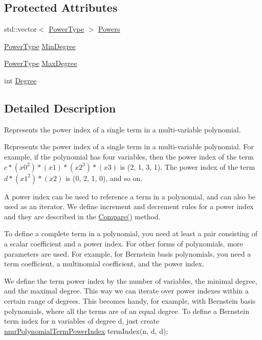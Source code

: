 \subsection*{Protected Attributes}
\begin{DoxyCompactItemize}
\item 
std\+::vector$<$ \hyperlink{classnmr_polynomial_term_power_index_a2eec01c3a2c3f56f47982ceffd8e36ed}{Power\+Type} $>$ \hyperlink{classnmr_polynomial_term_power_index_a05f4d771e733168086d285e1cf0e1d1e}{Powers}
\item 
\hyperlink{classnmr_polynomial_term_power_index_a2eec01c3a2c3f56f47982ceffd8e36ed}{Power\+Type} \hyperlink{classnmr_polynomial_term_power_index_a16ac64643c0802d0efb4bf3f617d0964}{Min\+Degree}
\item 
\hyperlink{classnmr_polynomial_term_power_index_a2eec01c3a2c3f56f47982ceffd8e36ed}{Power\+Type} \hyperlink{classnmr_polynomial_term_power_index_a9b831b9f652cd6053941aff903ddb024}{Max\+Degree}
\item 
int \hyperlink{classnmr_polynomial_term_power_index_a2794eed1b12205604c2d2d5806279368}{Degree}
\end{DoxyCompactItemize}


\subsection{Detailed Description}
Represents the power index of a single term in a multi-\/variable polynomial. 

Represents the power index of a single term in a multi-\/variable polynomial. For example, if the polynomial has four variables, then the power index of the term $c * (x0^2)*(x1)*(x2^3)*(x3)$ is (2, 1, 3, 1). The power index of the term $d * (x1^2)*(x2)$ is (0, 2, 1, 0), and so on.

A power index can be used to reference a term in a polynomial, and can also be used as an iterator. We define increment and decrement rules for a power index and they are described in the \hyperlink{classnmr_polynomial_term_power_index_ab2d0e6ddf4ba6552fe41a7f6f36060cf}{Compare()} method.

To define a complete term in a polynomial, you need at least a pair consisting of a scalar coefficient and a power index. For other forms of polynomials, more parameters are used. For example, for Bernstein basis polynomials, you need a term coefficient, a multinomial coefficient, and the power index.

We define the term power index by the number of variables, the minimal degree, and the maximal degree. This way we can iterate over power indexes within a certain range of degrees. This becomes handy, for example, with Bernstein basis polynomials, where all the terms are of an equal degree. To define a Bernstein term index for n variables of degree d, just create \hyperlink{classnmr_polynomial_term_power_index}{nmr\+Polynomial\+Term\+Power\+Index} term\+Index(n, d, d);

